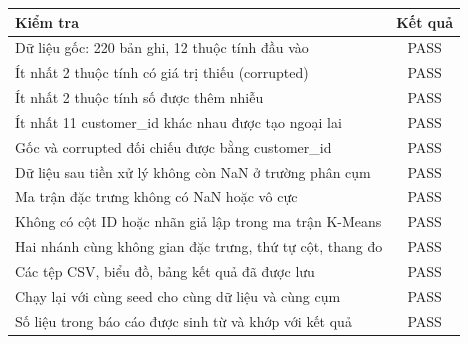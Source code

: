 \begin{tabular}{lc}
\toprule
Kiểm tra & Kết quả \\
\midrule
Dữ liệu gốc: 220 bản ghi, 12 thuộc tính đầu vào & PASS \\
Ít nhất 2 thuộc tính có giá trị thiếu (corrupted) & PASS \\
Ít nhất 2 thuộc tính số được thêm nhiễu & PASS \\
Ít nhất 11 customer\_id khác nhau được tạo ngoại lai & PASS \\
Gốc và corrupted đối chiếu được bằng customer\_id & PASS \\
Dữ liệu sau tiền xử lý không còn NaN ở trường phân cụm & PASS \\
Ma trận đặc trưng không có NaN hoặc vô cực & PASS \\
Không có cột ID hoặc nhãn giả lập trong ma trận K-Means & PASS \\
Hai nhánh cùng không gian đặc trưng, thứ tự cột, thang đo & PASS \\
Các tệp CSV, biểu đồ, bảng kết quả đã được lưu & PASS \\
Chạy lại với cùng seed cho cùng dữ liệu và cùng cụm & PASS \\
Số liệu trong báo cáo được sinh từ và khớp với kết quả & PASS \\
\bottomrule
\end{tabular}
